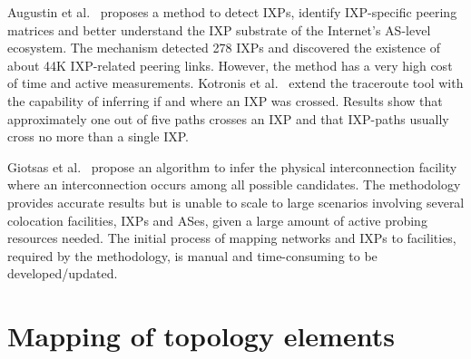 	Augustin et al.~\cite{Augustin:2009:IM:1644893.1644934} proposes a method to detect IXPs, identify IXP-specific peering matrices and better understand the IXP substrate of the Internet’s AS-level ecosystem. The mechanism detected 278 IXPs and discovered the existence of about 44K IXP-related peering links. However, the method has a very high cost of time and active measurements. Kotronis et al.~\cite{nomikos2016traixroute} extend the traceroute tool with the capability of inferring if and where an IXP was crossed. Results show that approximately one out of five paths crosses an IXP and that IXP-paths usually cross no more than a single IXP. 

	Giotsas et al.~\cite{Giotsas:2015:MPI:2716281.2836122} propose an algorithm to infer the physical interconnection facility where an interconnection occurs among all possible candidates. The methodology provides accurate results but is unable to scale to large scenarios involving several colocation facilities, IXPs and ASes, given a large amount of active probing resources needed. The initial process of mapping networks and IXPs to facilities, required by the methodology, is manual and time-consuming to be developed/updated.

	
	

	\section{Mapping of topology elements}
	\label{sec:rel-work-mapping-topo-elem}


